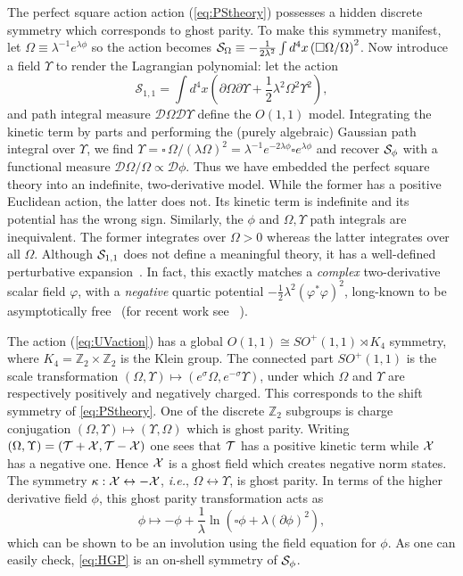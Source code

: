 \documentclass[pra,aps,amsmath,amssymb,notitlepage, twocolumn,superscriptaddress,longbibliography,nofootinbib,floatfix,10pt]{revtex4-2}
\begin{document}
The perfect square action action (\ref{eq:PStheory}) possesses a hidden discrete symmetry which corresponds to ghost parity. To make this symmetry manifest, let $\Omega \equiv  \lambda^{-1} e^{\lambda \phi}$ so the action becomes ${\cal S}_{\Omega} \equiv - \frac1{2\lambda^2} \int d^4x \left(\square \Omega / \Omega \right)^2$. Now introduce a field $\Upsilon$ to render the Lagrangian polynomial: let the action
\begin{equation}\label{eq:UVaction}
    \mathcal{S}_{1,1} =  \int d^4x \left(\partial\Omega \partial \Upsilon +\frac12 \lambda^2 \Omega^2 \Upsilon^2 \right),
\end{equation}
and path integral measure $\mathcal{D} \Omega \mathcal{D} \Upsilon $ define the $O(1,1)$ model. Integrating the kinetic term by parts and performing the (purely algebraic) Gaussian path integral over $\Upsilon$, we find $\Upsilon =  \square\, \Omega /(\lambda \Omega)^2=\lambda^{-1}e^{-2 \lambda \phi} \square e^{\lambda \phi}$ and recover ${\cal S}_{\phi}$ with a functional measure $\mathcal{D}\Omega/\Omega\propto \mathcal{D} \phi$. Thus we have embedded the perfect square theory into an indefinite, two-derivative model. While the former has a positive Euclidean action, the latter does not. Its kinetic term is indefinite and its potential has the wrong sign. Similarly, the $\phi$ and $\Omega,\Upsilon$ path integrals are inequivalent. The former integrates over $\Omega>0$ whereas the latter integrates over all $\Omega$. Although ${\cal S}_{1,1}$  does not define a meaningful theory, it has a well-defined perturbative expansion~\cite{ABHTshort,ABHTlong}. In fact, this exactly matches a {\it complex} two-derivative scalar field $\varphi$, with a {\it negative} quartic potential $-\frac12\lambda^2(\varphi^*\varphi)^2$, long-known to be asymptotically free~\cite{Symanzik:1973hx} (for recent work see ~\cite{Romatschke:2026zvd}).

The action (\ref{eq:UVaction}) has a global $O(1,1)\cong SO^+(1,1)\rtimes K_4$ symmetry, where $K_4=\mathbb{Z}_2\times \mathbb{Z}_2$ is the Klein group. The connected part $SO^+(1,1)$ is the scale transformation $(\Omega,\Upsilon)\mapsto (e^{\sigma}\Omega,e^{-\sigma}\Upsilon)$, under which $\Omega$ and $\Upsilon$ are respectively positively and negatively charged. This corresponds to the shift symmetry of \eqref{eq:PStheory}. One of the discrete $\mathbb{Z}_2$ subgroups is charge conjugation $(\Omega,\Upsilon)\mapsto (\Upsilon,\Omega)$ which is ghost parity. Writing $(\Omega,\Upsilon)=({\cal T+X},{\cal T-X})$ one sees that ${\cal T}$ has a positive kinetic term while ${\cal X}$ has a negative one. Hence ${\cal X}$ is a ghost field which creates negative norm states. The symmetry $\kappa:{\cal X}\leftrightarrow -{\cal X}$, {\it i.e.}, $\Omega\leftrightarrow\Upsilon$, is ghost parity. In terms of the higher derivative field $\phi$, this ghost parity transformation acts as
\begin{equation}
\label{eq:HGP}
\phi\mapsto-\phi+\frac1\lambda \ln \left(\square \phi +\lambda (\partial \phi)^2\right),
\end{equation}
which can be shown to be an involution using the field equation for $\phi$. As one can easily check, \eqref{eq:HGP} is an on-shell symmetry of ${\cal S}_\phi$.
\end{document}
